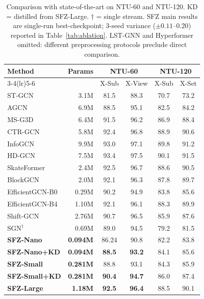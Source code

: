 \documentclass[sigconf,screen,review,anonymous]{acmart}
\newcommand{\best}[1]{{\color{bestcol}\textbf{#1}}}
\begin{document}
\begin{table}[t]
\centering
\caption{Comparison with state-of-the-art on NTU-60 and NTU-120.
  KD = distilled from SFZ-Large. $\dagger$ = single stream.
  SFZ main results are single-run best-checkpoint; 3-seed variance
  (${\pm}0.11$--$0.20$) reported in Table~\ref{tab:ablation}.
  LST-GNN and Hyperformer omitted: different preprocessing protocols
  preclude direct comparison.}
\label{tab:main}
\renewcommand{\arraystretch}{1.05}
\setlength{\tabcolsep}{3.2pt}
\begin{tabular}{lrcccc}
\toprule
\multirow{2}{*}{Method} & \multirow{2}{*}{Params} &
  \multicolumn{2}{c}{NTU-60} & \multicolumn{2}{c}{NTU-120}\\
\cmidrule(lr){3-4}\cmidrule(lr){5-6}
 & & X-Sub & X-View & X-Sub & X-Set \\
\midrule
ST-GCN~\cite{stgcn}   & 3.1M & 81.5 & 88.3 & 70.7 & 73.2 \\
AGCN~\cite{agcn}       & 6.9M & 88.5 & 95.1 & 82.5 & 84.2 \\
MS-G3D~\cite{msg3d}    & 6.4M & 91.5 & 96.2 & 86.9 & 88.4 \\
CTR-GCN~\cite{ctrgcn}  & 5.8M & 92.4 & 96.8 & 88.9 & 90.6 \\
InfoGCN~\cite{infogcn} & 9.9M & 93.0 & 97.1 & 89.8 & 91.2 \\
HD-GCN~\cite{hdgcn}    & 7.5M & 93.4 & 97.5 & 90.1 & 91.5 \\
SkateFormer~\cite{skateformer} & 2.4M & 92.5 & 96.7 & 88.6 & 90.5 \\
BlockGCN~\cite{blockgcn}       & 2.0M & 92.1 & 96.3 & 87.8 & 89.7 \\
\midrule
EfficientGCN-B0~\cite{efficientgcn} & 0.29M & 90.2 & 94.9 & 83.8 & 85.6 \\
EfficientGCN-B4~\cite{efficientgcn} & 1.10M & 92.1 & 96.1 & 88.3 & 89.9 \\
Shift-GCN~\cite{shiftgcn}           & 2.76M & 90.7 & 96.5 & 85.9 & 87.6 \\
SGN$^\dagger$~\cite{sgn}            & 0.69M & 89.0 & 94.5 & 79.2 & 81.5 \\
\midrule
\textbf{SFZ-Nano}       & \textbf{0.094M} & 86.24 & 90.8 & 82.2 & 83.8 \\
\textbf{SFZ-Nano+KD}    & \textbf{0.094M} & \best{88.5} & \best{93.2} & 84.1 & 85.6 \\
\textbf{SFZ-Small}      & \textbf{0.281M} & 88.8 & 93.1 & 84.3 & 85.9 \\
\textbf{SFZ-Small+KD}   & \textbf{0.281M} & \best{90.4} & \best{94.7} & 86.0 & 87.4 \\
\textbf{SFZ-Large}      & \textbf{1.18M} & \best{92.5} & \best{96.4} & 88.5 & 90.1 \\
\bottomrule
\end{tabular}
\vspace{-3mm}\end{table}
\end{document}
